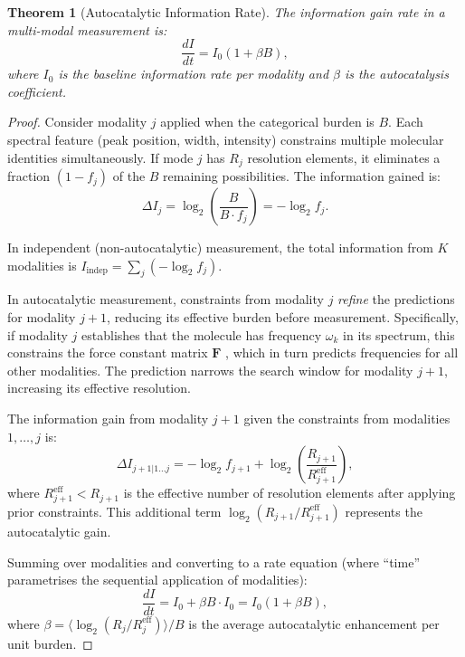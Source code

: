 \documentclass[11pt,twocolumn,a4paper]{article}
\newtheorem{theorem}{Theorem}[section]
\theoremstyle{definition}
\theoremstyle{remark}
\begin{document}
\begin{theorem}[Autocatalytic Information Rate]
\label{thm:autocatalytic}
The information gain rate in a multi-modal measurement is:
\begin{equation}
\frac{dI}{dt} = I_0 (1 + \beta B),
\end{equation}
where $I_0$ is the baseline information rate per modality and $\beta$ is the autocatalysis coefficient.
\end{theorem}

\begin{proof}
Consider modality $j$ applied when the categorical burden is $B$. Each spectral feature (peak position, width, intensity) constrains multiple molecular identities simultaneously. If mode $j$ has $R_j$ resolution elements, it eliminates a fraction $(1 - f_j)$ of the $B$ remaining possibilities. The information gained is:
\begin{equation}
\Delta I_j = \log_2\left(\frac{B}{B \cdot f_j}\right) = -\log_2 f_j.
\end{equation}

In independent (non-autocatalytic) measurement, the total information from $K$ modalities is $I_{\mathrm{indep}} = \sum_j (-\log_2 f_j)$.

In autocatalytic measurement, constraints from modality $j$ \emph{refine} the predictions for modality $j+1$, reducing its effective burden before measurement. Specifically, if modality $j$ establishes that the molecule has frequency $\omega_k$ in its spectrum, this constrains the force constant matrix $\mathbf{F}$ \citep{wilson1955}, which in turn predicts frequencies for all other modalities. The prediction narrows the search window for modality $j+1$, increasing its effective resolution.

The information gain from modality $j+1$ given the constraints from modalities $1, \ldots, j$ is:
\begin{equation}
\Delta I_{j+1 | 1\ldots j} = -\log_2 f_{j+1} + \log_2\left(\frac{R_{j+1}}{R_{j+1}^{\mathrm{eff}}}\right),
\end{equation}
where $R_{j+1}^{\mathrm{eff}} < R_{j+1}$ is the effective number of resolution elements after applying prior constraints. This additional term $\log_2(R_{j+1}/R_{j+1}^{\mathrm{eff}})$ represents the autocatalytic gain.

Summing over modalities and converting to a rate equation (where ``time'' parametrises the sequential application of modalities):
\begin{equation}
\frac{dI}{dt} = I_0 + \beta B \cdot I_0 = I_0(1 + \beta B),
\end{equation}
where $\beta = \langle \log_2(R_j/R_j^{\mathrm{eff}}) \rangle / B$ is the average autocatalytic enhancement per unit burden.
\end{proof}
\end{document}
